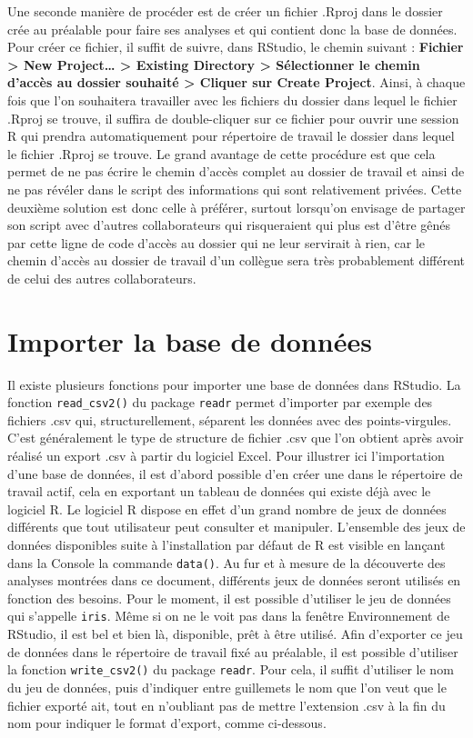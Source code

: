 \documentclass[
  french,
]{book}
\begin{document}
Une seconde manière de procéder est de créer un fichier .Rproj dans le dossier crée au préalable pour faire ses analyses et qui contient donc la base de données. Pour créer ce fichier, il suffit de suivre, dans RStudio, le chemin suivant : \textbf{Fichier \textgreater{} New Project\ldots{} \textgreater{} Existing Directory \textgreater{} Sélectionner le chemin d'accès au dossier souhaité \textgreater{} Cliquer sur Create Project}. Ainsi, à chaque fois que l'on souhaitera travailler avec les fichiers du dossier dans lequel le fichier .Rproj se trouve, il suffira de double-cliquer sur ce fichier pour ouvrir une session R qui prendra automatiquement pour répertoire de travail le dossier dans lequel le fichier .Rproj se trouve. Le grand avantage de cette procédure est que cela permet de ne pas écrire le chemin d'accès complet au dossier de travail et ainsi de ne pas révéler dans le script des informations qui sont relativement privées. Cette deuxième solution est donc celle à préférer, surtout lorsqu'on envisage de partager son script avec d'autres collaborateurs qui risqueraient qui plus est d'être gênés par cette ligne de code d'accès au dossier qui ne leur servirait à rien, car le chemin d'accès au dossier de travail d'un collègue sera très probablement différent de celui des autres collaborateurs.

\hypertarget{importer-la-base-de-donnuxe9es}{%
\section{Importer la base de données}\label{importer-la-base-de-donnuxe9es}}

Il existe plusieurs fonctions pour importer une base de données dans RStudio. La fonction \texttt{read\_csv2()} du package \texttt{readr} permet d'importer par exemple des fichiers .csv qui, structurellement, séparent les données avec des points-virgules. C'est généralement le type de structure de fichier .csv que l'on obtient après avoir réalisé un export .csv à partir du logiciel Excel. Pour illustrer ici l'importation d'une base de données, il est d'abord possible d'en créer une dans le répertoire de travail actif, cela en exportant un tableau de données qui existe déjà avec le logiciel R. Le logiciel R dispose en effet d'un grand nombre de jeux de données différents que tout utilisateur peut consulter et manipuler. L'ensemble des jeux de données disponibles suite à l'installation par défaut de R est visible en lançant dans la Console la commande \texttt{data()}. Au fur et à mesure de la découverte des analyses montrées dans ce document, différents jeux de données seront utilisés en fonction des besoins. Pour le moment, il est possible d'utiliser le jeu de données qui s'appelle \texttt{iris}. Même si on ne le voit pas dans la fenêtre Environnement de RStudio, il est bel et bien là, disponible, prêt à être utilisé. Afin d'exporter ce jeu de données dans le répertoire de travail fixé au préalable, il est possible d'utiliser la fonction \texttt{write\_csv2()} du package \texttt{readr}. Pour cela, il suffit d'utiliser le nom du jeu de données, puis d'indiquer entre guillemets le nom que l'on veut que le fichier exporté ait, tout en n'oubliant pas de mettre l'extension .csv à la fin du nom pour indiquer le format d'export, comme ci-dessous.
\end{document}
